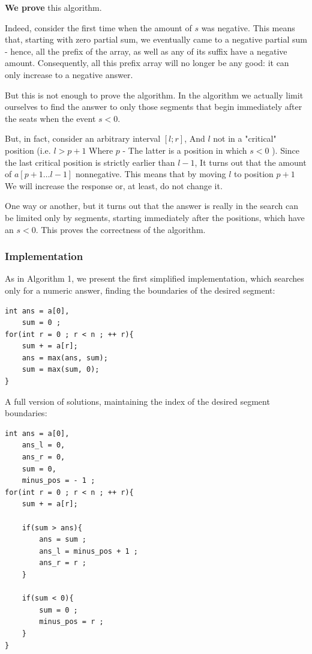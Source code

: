 \textbf{We prove} this algorithm.

Indeed, consider the first time when the amount of $s$ was negative. This means that, starting with zero partial sum, we eventually came to a negative partial sum - hence, all the prefix of the array, as well as any of its suffix have a negative amount. Consequently, all this prefix array will no longer be any good: it can only increase to a negative answer.

But this is not enough to prove the algorithm. In the algorithm we actually limit ourselves to find the answer to only those segments that begin immediately after the seats when the event $s <0$.

But, in fact, consider an arbitrary interval $[l; r]$, And $l$ not in a "critical" position (i.e. $l> p +1$ Where $p$ - The latter is a position in which $s <0$ ). Since the last critical position is strictly earlier than $l-1$, It turns out that the amount of $a [p +1 \ldots l-1]$ nonnegative. This means that by moving $l$ to position $p +1$ We will increase the response or, at least, do not change it.

One way or another, but it turns out that the answer is really in the search can be limited only by segments, starting immediately after the positions, which have an $s <0$. This proves the correctness of the algorithm.

\subsubsection{ Implementation }

As in Algorithm 1, we present the first simplified implementation, which searches only for a numeric answer, finding the boundaries of the desired segment:

\begin{verbatim}
int ans = a[0],
    sum = 0 ;
for(int r = 0 ; r < n ; ++ r){
    sum + = a[r];
    ans = max(ans, sum);
    sum = max(sum, 0);
} 
\end{verbatim}
A full version of solutions, maintaining the index of the desired segment boundaries:

\begin{verbatim}
int ans = a[0],
    ans_l = 0,
    ans_r = 0,
    sum = 0,
    minus_pos = - 1 ;
for(int r = 0 ; r < n ; ++ r){
    sum + = a[r];
 
    if(sum > ans){
        ans = sum ;
        ans_l = minus_pos + 1 ;
        ans_r = r ;
    }
 
    if(sum < 0){
        sum = 0 ;
        minus_pos = r ;
    }
} 
\end{verbatim}
